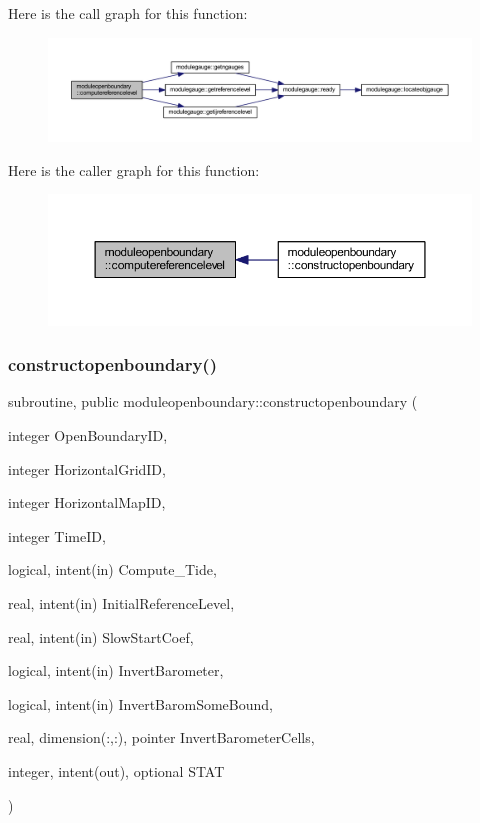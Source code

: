 Here is the call graph for this function\+:\nopagebreak
\begin{figure}[H]
\begin{center}
\leavevmode
\includegraphics[width=350pt]{namespacemoduleopenboundary_a4aaa938f269710f21fa7500a3501905a_cgraph}
\end{center}
\end{figure}
Here is the caller graph for this function\+:\nopagebreak
\begin{figure}[H]
\begin{center}
\leavevmode
\includegraphics[width=350pt]{namespacemoduleopenboundary_a4aaa938f269710f21fa7500a3501905a_icgraph}
\end{center}
\end{figure}
\mbox{\label{namespacemoduleopenboundary_a4de0cd486a833b86ff9e035de046ff81}} 
\subsubsection{\texorpdfstring{constructopenboundary()}{constructopenboundary()}}
{\footnotesize\ttfamily subroutine, public moduleopenboundary\+::constructopenboundary (\begin{DoxyParamCaption}\item[{integer}]{Open\+Boundary\+ID,  }\item[{integer}]{Horizontal\+Grid\+ID,  }\item[{integer}]{Horizontal\+Map\+ID,  }\item[{integer}]{Time\+ID,  }\item[{logical, intent(in)}]{Compute\+\_\+\+Tide,  }\item[{real, intent(in)}]{Initial\+Reference\+Level,  }\item[{real, intent(in)}]{Slow\+Start\+Coef,  }\item[{logical, intent(in)}]{Invert\+Barometer,  }\item[{logical, intent(in)}]{Invert\+Barom\+Some\+Bound,  }\item[{real, dimension(\+:,\+:), pointer}]{Invert\+Barometer\+Cells,  }\item[{integer, intent(out), optional}]{S\+T\+AT }\end{DoxyParamCaption})}

